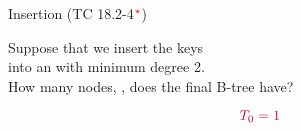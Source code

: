 
\begin{frame}{}
  \begin{exampleblock}{Insertion (TC 18.2-4$^{\textcolor{red}{\star}}$)}
    \begin{center}
      Suppose that we insert the keys   \\[5pt]
      into an  with minimum degree 2. \\[6pt]
      How many nodes, , does the final B-tree have?
    \end{center}
  \end{exampleblock}

  \pause
  \[
    \textcolor{purple}{T_{0} = 1}
  \]
\end{frame}
